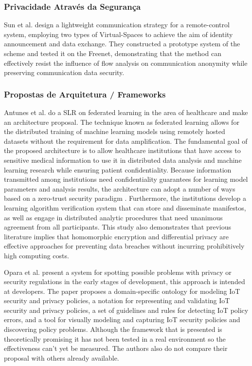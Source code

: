 \documentclass[conference]{IEEEtran}
\begin{document}
\subsubsection{Privacidade Através da Segurança}

Sun et al. \cite{SunSecure} design a lightweight communication strategy
for a remote-control system, employing two types of Virtual-Spaces to achieve
the aim of identity announcement and data exchange. They constructed a prototype
system of the scheme and tested it on the Freenet, demonstrating that the
method can effectively resist the influence of flow analysis on communication
anonymity while preserving communication data security.

\subsubsection{Propostas de Arquitetura / Frameworks}

Antunes et al. \cite{AntunesFederated} do a SLR on federated learning in
the area of healthcare and make an architecture proposal. The technique
known as federated learning allows for the distributed training of machine
learning models using remotely hosted datasets without the requirement for
data amplification. The fundamental goal of the proposed architecture is
to allow healthcare institutions that have access to sensitive medical information
to use it in distributed data analysis and machine learning research while
ensuring patient confidentiality. Because information transmitted among
institutions need confidentiality guarantees for learning model parameters
and analysis results, the architecture can adopt a number of ways based on
a zero-trust security paradigm \cite{ChenSecurity}. Furthermore, the institutions
develop a learning algorithm verification system that can store and disseminate
manifestos, as well as engage in distributed analytic procedures that need
unanimous agreement from all participants. This study also demonstrates
that previous literature implies that homomorphic encryption and differential
privacy are effective approaches for preventing data breaches without incurring
prohibitively high computing costs.

Opara et al. \cite{opara2022framework} present a system for spotting possible
problems with privacy or security regulations in the early stages of development,
this approach is intended at developers. The paper proposes a domain-specific
ontology for modeling IoT security and privacy policies, a notation for
representing and validating IoT security and privacy policies, a set of
guidelines and rules for detecting IoT policy errors, and a tool for visually
modeling and capturing IoT security policies and discovering policy problems.
Although the framework that is presented is theoretically promising it has
not been tested in a real environment so the effectiveness can't yet be
measured. The authors also do not compare their proposal with others already
available.
\end{document}
